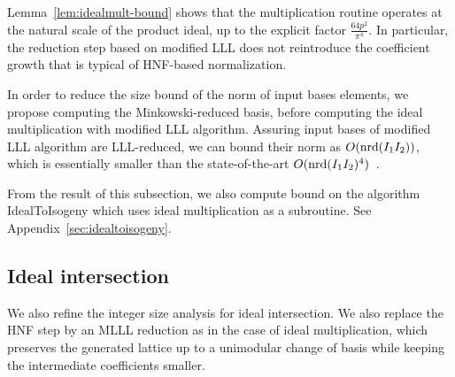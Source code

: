 Lemma~\ref{lem:idealmult-bound} shows that the multiplication routine operates at the natural scale of the product ideal, up to the explicit factor $\frac{64p^2}{\pi^4}$. In particular, the reduction step based on modified LLL does not reintroduce the coefficient growth that is typical of HNF-based normalization.

\begin{remark}
In order to reduce the size bound of the norm of input bases elements, we propose computing the Minkowski-reduced basis, before computing the ideal multiplication with modified LLL algorithm.
Assuring input bases of modified LLL algorithm are LLL-reduced, we can bound their norm as $O(\mathrm{nrd}(I_1I_2))$, which is essentially smaller than the state-of-the-art $O(\mathrm{nrd}(I_1I_2)^4)$~\cite[Lemma~12]{KLKL25}.
\end{remark}

From the result of this subsection, we also compute bound on the algorithm \textsf{IdealToIsogeny} which uses ideal multiplication as a subroutine. See Appendix~\ref{sec:idealtoisogeny}.


\subsection{Ideal intersection}
\label{subsec:idealintersection}

We also refine the integer size analysis for ideal intersection.
We also replace the HNF step by an MLLL reduction as in the case of ideal multiplication, which preserves the generated lattice up to a unimodular change of basis while keeping the intermediate coefficients smaller.






